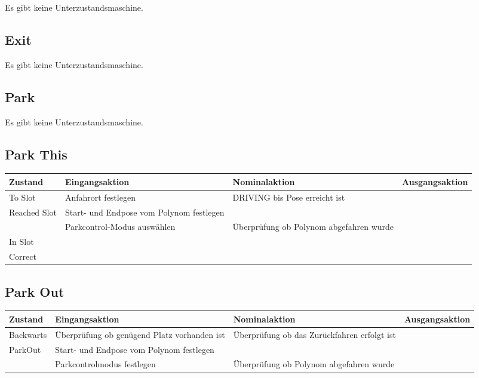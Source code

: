 Es gibt keine Unterzustandsmaschine.

\subsection{Exit}

Es gibt keine Unterzustandsmaschine.

\subsection{Park}

Es gibt keine Unterzustandsmaschine.

\subsection{Park This}

\begin{tabular}{|p{1.5cm}|p{4cm}|p{4cm}|p{3cm}|}
	\hline 
	Zustand & Eingangsaktion & Nominalaktion & Ausgangsaktion \\ 
	\hline 
	To Slot & Anfahrort festlegen & DRIVING bis Pose erreicht ist &  \\ 
	\hline 
	Reached Slot & Start- und Endpose vom Polynom festlegen &  &  \\ 
	\hline 
	 & Parkcontrol-Modus auswählen & Überprüfung ob Polynom abgefahren wurde &  \\ 
	\hline
	In Slot &  &  &  \\ 
	\hline 
	Correct &  &  &  \\ 
	\hline
\end{tabular} 

\subsection{Park Out}

\begin{tabular}{|p{1.7cm}|p{4cm}|p{4cm}|p{3cm}|}
	\hline 
	Zustand & Eingangsaktion & Nominalaktion & Ausgangsaktion \\ 
	\hline 
	Backwarts & Überprüfung ob genügend Platz vorhanden ist & Überprüfung ob das Zurückfahren erfolgt ist &  \\ 
	\hline 
	ParkOut & Start- und Endpose vom Polynom festlegen  &  &  \\ 
	\hline  
	& Parkcontrolmodus festlegen & Überprüfung ob Polynom abgefahren wurde &  \\ 
	\hline
 
\end{tabular} 